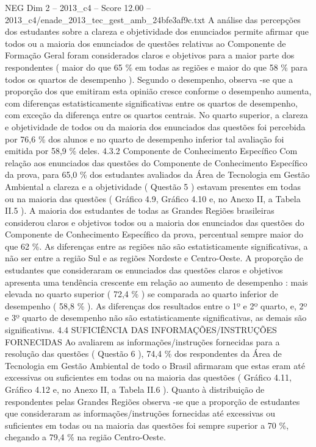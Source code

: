 \begin{textsample}{NEG Dim 2 – 2013\_c4 – Score 12.00 – 2013\_c4/enade\_2013\_tec\_gest\_amb\_24bfe3af9c.txt}
A análise das percepções dos estudantes sobre a clareza e objetividade dos enunciados permite afirmar que todos ou a maioria dos enunciados de questões relativas ao Componente de Formação Geral foram considerados claros e objetivos para a maior parte dos respondentes ( maior do que 65 \% em todas as regiões e maior do que 58 \% para todos os quartos de desempenho ).
Segundo o desempenho, observa -se que a proporção dos que emitiram esta opinião cresce conforme o desempenho aumenta, com diferenças estatisticamente significativas entre os quartos de desempenho, com exceção da diferença entre os quartos centrais.
No quarto superior, a clareza e objetividade de todos ou da maioria dos enunciados das questões foi percebida por 76,6 \% dos alunos e no quarto de desempenho inferior tal avaliação foi emitida por 58,9 \% deles. 4.3.2 Componente de Conhecimento Específico Com relação aos enunciados das questões do Componente de Conhecimento Específico da prova, para 65,0 \% dos estudantes avaliados da Área de Tecnologia em Gestão Ambiental a clareza e a objetividade ( Questão 5 ) estavam presentes em todas ou na maioria das questões ( Gráfico 4.9, Gráfico 4.10 e, no Anexo II, a Tabela II.5 ).
A maioria dos estudantes de todas as Grandes Regiões brasileiras considerou claros e objetivos todos ou a maioria dos enunciados das questões do Componente de Conhecimento Específico da prova, percentual sempre maior do que 62 \%.
As diferenças entre as regiões não são estatisticamente significativas, a não ser entre a região Sul e as regiões Nordeste e Centro-Oeste.
A proporção de estudantes que consideraram os enunciados das questões claros e objetivos apresenta uma tendência crescente em relação ao aumento de desempenho : mais elevada no quarto superior ( 72,4 \% ) se comparada ao quarto inferior de desempenho ( 58,8 \% ).
As diferenças dos resultados entre o 1º e 2º quarto, e, 2º e 3º quarto de desempenho não são estatisticamente significativas, as demais são significativas. 4.4 SUFICIÊNCIA DAS INFORMAÇÕES/INSTRUÇÕES FORNECIDAS Ao avaliarem as informações/instruções fornecidas para a resolução das questões ( Questão 6 ), 74,4 \% dos respondentes da Área de Tecnologia em Gestão Ambiental de todo o Brasil afirmaram que estas eram até excessivas ou suficientes em todas ou na maioria das questões ( Gráfico 4.11, Gráfico 4.12 e, no Anexo II, a Tabela II.6 ).
Quanto à distribuição de respondentes pelas Grandes Regiões observa -se que a proporção de estudantes que consideraram as informações/instruções fornecidas até excessivas ou suficientes em todas ou na maioria das questões foi sempre superior a 70 \%, chegando a 79,4 \% na região Centro-Oeste.

\end{textsample}
